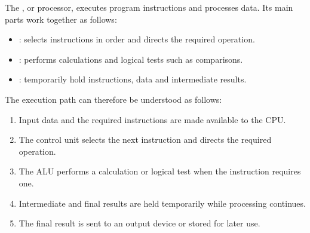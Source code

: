 The , or processor, executes program instructions and processes data. Its main parts work together as follows:

\begin{itemize}
    \item {}: selects instructions in order and directs the required operation.
    \item {}: performs calculations and logical tests such as comparisons.
    \item {}: temporarily hold instructions, data and intermediate results.
\end{itemize}

The execution path can therefore be understood as follows:

\begin{enumerate}
    \item Input data and the required instructions are made available to the CPU.
    \item The control unit selects the next instruction and directs the required operation.
    \item The ALU performs a calculation or logical test when the instruction requires one.
    \item Intermediate and final results are held temporarily while processing continues.
    \item The final result is sent to an output device or stored for later use.
\end{enumerate}

